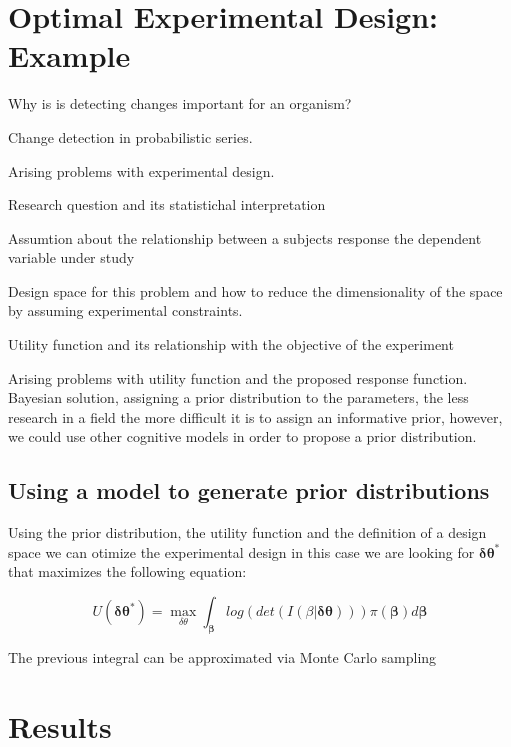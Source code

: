\documentclass[preprint,review,12pt]{elsarticle}
\begin{document}
\section{Optimal Experimental Design: Example}
\label{S:2}

Why is is detecting changes important for an organism?

Change detection in probabilistic series.

Arising problems with experimental design.

Research question and its statistichal interpretation

Assumtion about the relationship between a subjects response the dependent variable under study

Design space for this problem and how to reduce the dimensionality of the space by assuming experimental constraints.

Utility function and its relationship with the objective of the experiment

Arising problems with utility function and the proposed response function. Bayesian solution, assigning a prior distribution to the parameters, the less research in a field the more difficult it is to assign an informative prior, however, we could use other cognitive models in order to propose a prior distribution. 
\subsection{Using a model to generate prior distributions}

Using the prior distribution, the utility function and the definition of a design space we can otimize the experimental design in this case we are looking for \begin{math}\mathbf{\delta\theta}^{*}\end{math} that maximizes the following equation:

\begin{equation}
U(\mathbf{\delta\theta}^{*})=\max_{\delta\theta} \int_{\mathbf{\beta}} log(det(I(\beta|\mathbf{\delta\theta}))) \pi(\mathbf{\beta}) d\mathbf{\beta}
\end{equation}

The previous integral can be approximated via Monte Carlo sampling

\section{Results}
\label{S:3}
\end{document}

